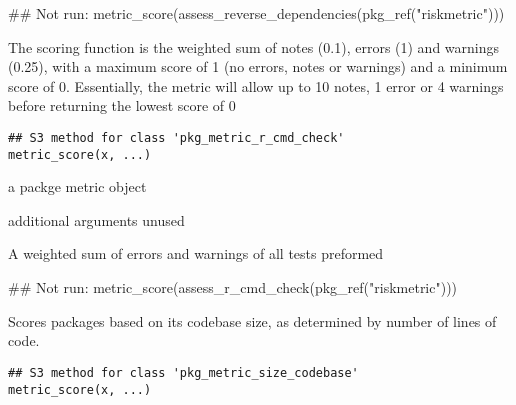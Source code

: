 \documentclass[a4paper]{book}
\begin{document}
%
\begin{Examples}
\begin{ExampleCode}
## Not run: metric_score(assess_reverse_dependencies(pkg_ref("riskmetric")))

\end{ExampleCode}
\end{Examples}
%
\begin{Description}
The scoring function is the weighted sum of notes (0.1), errors (1) and warnings (0.25), with a maximum score of 1 (no errors, notes or warnings)
and a minimum score of 0.
Essentially, the metric will allow up to 10 notes, 1 error or 4 warnings before returning the lowest score of 0
\end{Description}
%
\begin{Usage}
\begin{verbatim}
## S3 method for class 'pkg_metric_r_cmd_check'
metric_score(x, ...)
\end{verbatim}
\end{Usage}
%
\begin{Arguments}
\begin{ldescription}
\item[\code{x}] a  packge metric object

\item[\code{...}] additional arguments unused
\end{ldescription}
\end{Arguments}
%
\begin{Value}
A weighted sum of errors and warnings of all tests preformed
\end{Value}
%
\begin{Examples}
\begin{ExampleCode}
## Not run: metric_score(assess_r_cmd_check(pkg_ref("riskmetric")))

\end{ExampleCode}
\end{Examples}
%
\begin{Description}
Scores packages based on its codebase size, as determined by number of lines of code.
\end{Description}
%
\begin{Usage}
\begin{verbatim}
## S3 method for class 'pkg_metric_size_codebase'
metric_score(x, ...)
\end{verbatim}
\end{Usage}
\end{document}
